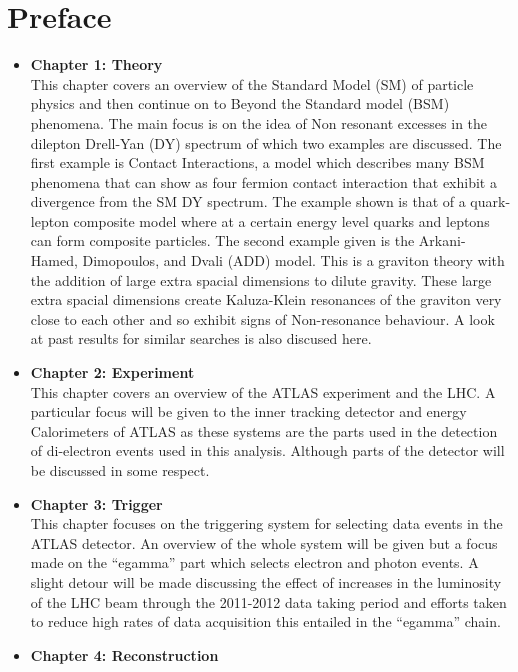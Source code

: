 \chapter*{Preface}

\begin{itemize}

\item{ 
{\bf Chapter 1: Theory} \\
This chapter covers an overview of the Standard Model (SM) of particle physics and then continue on to Beyond the Standard model (BSM) phenomena. The main focus is on the idea of Non resonant excesses in the dilepton Drell-Yan (DY) spectrum of which two examples are discussed. The first example is Contact Interactions, a model which describes many BSM phenomena that can show as four fermion contact interaction that exhibit a divergence from the SM DY spectrum. The example shown is that of a quark-lepton composite model where at a certain energy level quarks and leptons can form composite particles. The second example given is the Arkani-Hamed, Dimopoulos, and Dvali (ADD) model. This is a graviton theory with the addition of large extra spacial dimensions to dilute gravity. These large extra spacial dimensions create Kaluza-Klein resonances of the graviton very close to each other and so exhibit signs of Non-resonance behaviour. A look at past results for similar searches is also discused here.
}
\item{ 
{\bf Chapter 2: Experiment} \\
This chapter covers an overview of the ATLAS experiment and the LHC. A particular focus will be given to the inner tracking detector and energy Calorimeters of ATLAS as these systems are the parts used in the detection of di-electron events used in this analysis. Although parts of the detector will be discussed in some respect.
}
\item{ 
{\bf Chapter 3: Trigger} \\
This chapter focuses on the triggering system for selecting data events in the ATLAS detector. An overview of the whole system will be given but a focus made on the ``egamma'' part which selects electron and photon events. A slight detour will be made discussing the effect of increases in the luminosity of the LHC beam through the 2011-2012 data taking period and efforts taken to reduce high rates of data acquisition this entailed in the ``egamma'' chain.
}
\item{ 
{\bf Chapter 4: Reconstruction} \\
}
\end{itemize}
